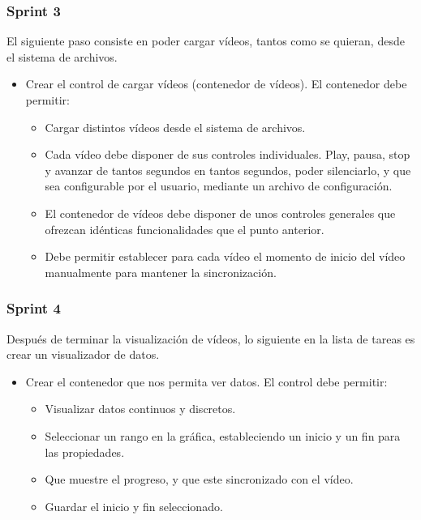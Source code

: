 \subsubsection{Sprint 3}
El siguiente paso consiste en poder cargar v\'{i}deos, tantos como se quieran, desde el sistema de archivos.

\begin{itemize}
    \item Crear el control de cargar v\'{i}deos (contenedor de v\'{i}deos). El contenedor debe 
    permitir:
    \begin{itemize}
        \item Cargar distintos v\'{i}deos desde el sistema de archivos.
        \item Cada v\'{i}deo debe disponer de sus controles individuales. Play, pausa, stop y 
        avanzar de tantos segundos en tantos 
        segundos, poder silenciarlo, y que sea configurable por el usuario, mediante un archivo 
        de configuraci\'{o}n.
        \item El contenedor de v\'{i}deos debe disponer de unos controles generales que ofrezcan 
        id\'enticas funcionalidades
        que el punto anterior.
        \item Debe permitir establecer para cada v\'{i}deo el momento de inicio del v\'{i}deo 
        manualmente para mantener la 
        sincronizaci\'{o}n.
    \end{itemize}
\end{itemize}

\subsubsection{Sprint 4}
Despu\'{e}s de terminar la visualizaci\'{o}n de v\'{i}deos, lo siguiente en la lista de tareas es 
crear un visualizador de datos.

\begin{itemize}
    \item Crear el contenedor que nos permita ver datos. El control debe permitir:
    \begin{itemize}
        \item Visualizar datos continuos y discretos.
        \item Seleccionar un rango en la gr\'{a}fica, estableciendo un inicio y un fin para las 
        propiedades.
        \item Que muestre el progreso, y que este sincronizado con el v\'{i}deo.
        \item Guardar el inicio y fin seleccionado.
    \end{itemize}
\end{itemize}

